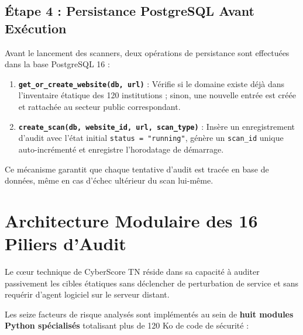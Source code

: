 \subsection{Étape 4 : Persistance PostgreSQL Avant Exécution}
Avant le lancement des scanners, deux opérations de persistance sont effectuées dans la base PostgreSQL 16 :
\begin{enumerate}
    \item \textbf{\texttt{get\_or\_create\_website(db, url)}} : Vérifie si le domaine existe déjà dans l'inventaire étatique des 120 institutions ; sinon, une nouvelle entrée est créée et rattachée au secteur public correspondant.
    \item \textbf{\texttt{create\_scan(db, website\_id, url, scan\_type)}} : Insère un enregistrement d'audit avec l'état initial \texttt{status = "running"}, génère un \texttt{scan\_id} unique auto-incrémenté et enregistre l'horodatage de démarrage.
\end{enumerate}
Ce mécanisme garantit que chaque tentative d'audit est tracée en base de données, même en cas d'échec ultérieur du scan lui-même.

\section{Architecture Modulaire des 16 Piliers d'Audit}
Le cœur technique de CyberScore TN réside dans sa capacité à auditer passivement les cibles étatiques sans déclencher de perturbation de service et sans requérir d'agent logiciel sur le serveur distant.

Les seize facteurs de risque analysés sont implémentés au sein de \textbf{huit modules Python spécialisés} totalisant plus de 120 Ko de code de sécurité :

